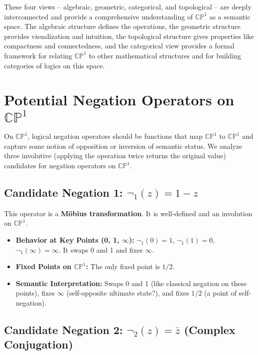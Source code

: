 \documentclass{article}
\begin{document}
	These four views -- algebraic, geometric, categorical, and topological -- are deeply interconnected and provide a comprehensive understanding of $\mathbb{CP}^1$ as a semantic space. The algebraic structure defines the operations, the geometric structure provides visualization and intuition, the topological structure gives properties like compactness and connectedness, and the categorical view provides a formal framework for relating $\mathbb{CP}^1$ to other mathematical structures and for building categories of logics on this space.
	
	\section{Potential Negation Operators on $\mathbb{CP}^1$}
	
	On $\mathbb{CP}^1$, logical negation operators should be functions that map $\mathbb{CP}^1$ to $\mathbb{CP}^1$ and capture some notion of opposition or inversion of semantic status. We analyze three involutive (applying the operation twice returns the original value) candidates for negation operators on $\mathbb{CP}^1$.
	
	\subsection{Candidate Negation 1: $\neg_1(z) = 1 - z$}
	
	This operator is a \textbf{M\"{o}bius transformation}. It is well-defined and an involution on $\mathbb{CP}^1$.
	
	\begin{itemize}
		\item \textbf{Behavior at Key Points (0, 1, $\infty$):} $\neg_1(0) = 1$, $\neg_1(1) = 0$, $\neg_1(\infty) = \infty$. It swaps 0 and 1 and fixes $\infty$.
		
		\item \textbf{Fixed Points on $\mathbb{CP}^1$:} The only fixed point is $1/2$.
		
		\item \textbf{Semantic Interpretation:} Swaps 0 and 1 (like classical negation on these points), fixes $\infty$ (self-opposite ultimate state?), and fixes $1/2$ (a point of self-negation).
	\end{itemize}
	
	\subsection{Candidate Negation 2: $\neg_2(z) = \bar{z}$ (Complex Conjugation)}
	
\end{document}
